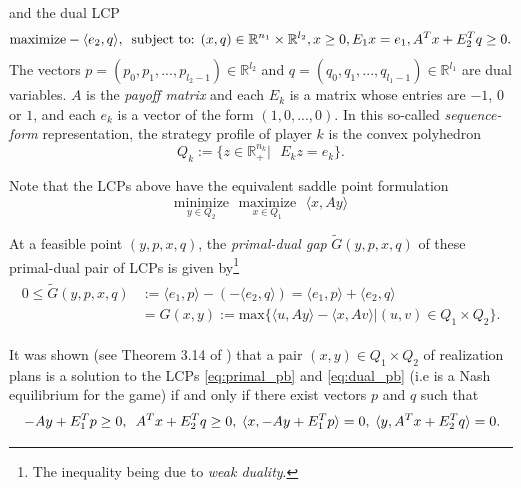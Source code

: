 \documentclass{article} %
\begin{document}
and the dual LCP
\begin{equation}
  \begin{aligned}
    \text{maximize}-\langle e_2, q\rangle,\hspace{.5em}\text{subject
      to: }(x,q) \in \mathbb{R}^{n_1} \times \mathbb{R}^{l_2},  x \ge
    0, E_1x = e_1, A^Tx + E_2^Tq \geq 0.
  \end{aligned}
  \label{eq:dual_pb}
\end{equation}
The vectors $p = (p_0, p_1, ..., p_{l_2 - 1}) \in \mathbb{R}^{l_2}$
and $q = (q_0, q_1, ..., q_{l_1 - 1}) \in \mathbb{R}^{l_1}$ are dual
variables. 
$A$ is the \textit{payoff matrix} and each $E_k$ is a matrix whose
entries are $-1$, $0$ or $1$, and each $e_k$ is a vector of the form
$(1, 0, ..., 0)$. In this so-called \textit{sequence-form}
representation, the strategy profile of player $k$ is the convex polyhedron
\begin{equation}
  Q_k := \{z \in \mathbb{R}^{n_k}_+ |\text{ }E_kz = e_k\}.
\label{eq:polyhedron}
\end{equation}

Note that the LCPs above have the equivalent saddle point formulation
\begin{equation}
  \underset{y \in Q_2}{\text{minimize}}\text{ }\underset{x \in
    Q_1}{\text{maximize}}\text{ }\langle x, Ay\rangle
  \label{eq:gilpin}
\end{equation}

At a feasible point $(y, p, x, q)$, the \textit{primal-dual gap}
$\tilde{G}(y, p, x, q)$ of these primal-dual pair of LCPs is given
by\footnote{The inequality being due to \textit{weak duality}.}
\begin{eqnarray}
  \begin{split}
  0 \le \tilde{G}(y, p, x, q) &:= \langle e_1, p\rangle - (-\langle
  e_2, q\rangle) = \langle e_1, p\rangle + \langle
  e_2, q\rangle\\
  &= G(x, y) := \mathrm{max}\{\langle u, Ay\rangle - \langle x, Av\rangle |
(u,v) \in Q_1 \times Q_2\}.
\end{split}
  \label{eq:dgap}
\end{eqnarray}

It was shown (see Theorem 3.14 of \cite{vonequilibrium}) that a pair
$(x, y) \in Q_1 \times Q_2$ of realization plans is a solution to the
LCPs \eqref{eq:primal_pb} and \eqref{eq:dual_pb} (i.e is a Nash
equilibrium for the game)  if and only if there exist vectors $p$ and
$q$ such that
\begin{equation}
\hspace{.25em} -Ay + E_1^Tp \ge 0, \hspace{.5em}A^Tx + E_2^Tq \ge
0, \hspace{.25em} \langle x, -Ay + E_1^Tp\rangle = 0, \hspace{.25em}
\langle y, A^Tx  + E_2^Tq\rangle = 0.
\label{eq:feasibility}
\end{equation}
\end{document}
